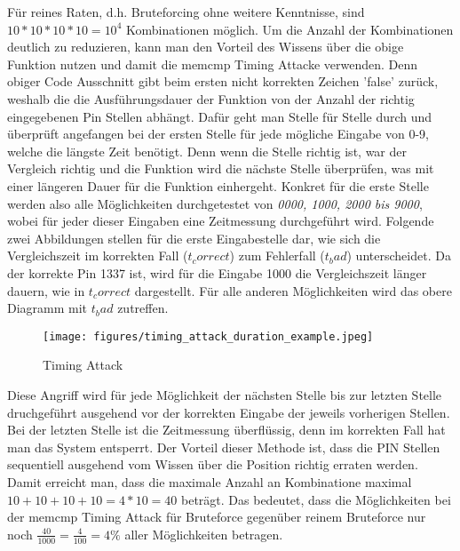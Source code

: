 \documentclass[a4paper,
DIV=13,
12pt,
BCOR=10mm,
department=FakIM,
oneside,
parskip=half,
automark,
listof=totocnumbered,
bibliography=totocnumbered,
acronym=totocnumbered
] {OTHRartcl}
\begin{document}
Für reines Raten, d.h. Bruteforcing ohne weitere Kenntnisse, sind $ 10*10*10*10 = 10^4 $ Kombinationen möglich.
Um die Anzahl der Kombinationen deutlich zu reduzieren, kann man den Vorteil des Wissens über die obige Funktion nutzen und damit
die memcmp Timing Attacke verwenden.
Denn obiger Code Ausschnitt gibt beim ersten nicht korrekten Zeichen 'false' zurück, weshalb die die Ausführungsdauer der
Funktion von der Anzahl der richtig eingegebenen Pin Stellen abhängt.
Dafür geht man Stelle für Stelle durch und überprüft angefangen bei der ersten Stelle für jede mögliche Eingabe von 0-9, welche die längste Zeit benötigt.
Denn wenn die Stelle richtig ist, war der Vergleich richtig und die Funktion wird die nächste Stelle überprüfen, was mit einer längeren Dauer für die Funktion
einhergeht.
Konkret für die erste Stelle werden also alle Möglichkeiten durchgetestet von \textit{0000, 1000, 2000 bis 9000}, wobei für jeder dieser Eingaben
eine Zeitmessung durchgeführt wird.
Folgende zwei Abbildungen stellen für die erste Eingabestelle dar, wie sich die Vergleichszeit im
korrekten Fall ($t_correct$) zum Fehlerfall ($t_bad$) unterscheidet.
Da der korrekte Pin 1337 ist, wird für die Eingabe 1000 die Vergleichszeit länger dauern, wie in $t_correct$ dargestellt.
Für alle anderen Möglichkeiten wird das obere Diagramm mit $t_bad$ zutreffen.
\begin{figure}[ht!]
  \begin{center}
    \texttt{[image: figures/timing\_attack\_duration\_example.jpeg]}
    \caption{Timing Attack}
    \label{fig: Timing Attack}
  \end{center}
\end{figure}
Diese Angriff wird für jede Möglichkeit der nächsten Stelle bis zur letzten Stelle druchgeführt ausgehend vor der korrekten Eingabe der jeweils vorherigen Stellen.
Bei der letzten Stelle ist die Zeitmessung überflüssig, denn im korrekten Fall hat man das System entsperrt.
Der Vorteil dieser Methode ist, dass die PIN Stellen sequentiell ausgehend vom Wissen über die Position richtig erraten werden.
Damit erreicht man, dass die maximale Anzahl an Kombinatione maximal $10+10+10+10 = 4*10 = 40 $ beträgt.
Das bedeutet, dass die Möglichkeiten bei der memcmp Timing Attack für Bruteforce gegenüber reinem Bruteforce nur noch $\frac{40}{1000} = \frac{4}{100} = 4\% $
aller Möglichkeiten betragen.
\end{document}
